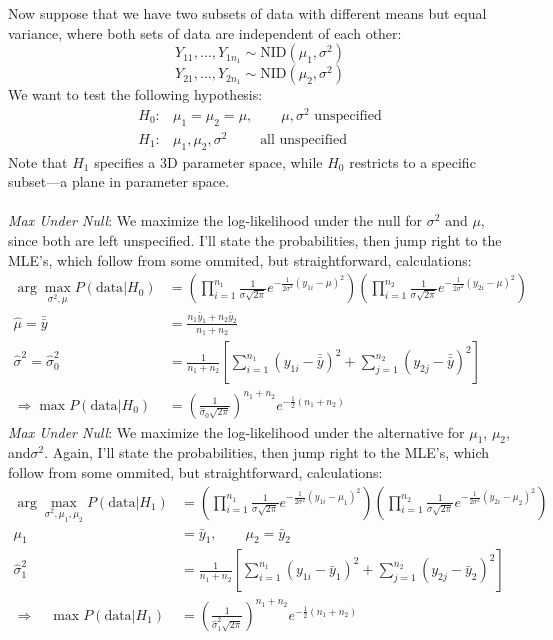 \documentclass[a4paper,12pt]{scrartcl}
\begin{document}
Now suppose that we have two subsets of data with different means
but equal variance, where both sets of data are independent of each
other:
   \[ Y_{11}, \ldots, Y_{1n_1} \sim \text{NID}(\mu_1, \sigma^2) \]
   \[ Y_{21}, \ldots, Y_{2n_1} \sim \text{NID}(\mu_2, \sigma^2) \]
We want to test the following hypothesis:
\begin{align*}
   H_0:& \mu_1 = \mu_2 = \mu, \qquad \mu, \sigma^2
      \text{ unspecified} \\
    H_1:& \mu_1, \mu_2, \sigma^2 \qquad \text{ all unspecified}
\end{align*}
Note that $H_1$ specifies a 3D parameter space, while $H_0$ restricts
to a specific subset---a plane in parameter space.
\\
\\
{\sl Max Under Null}: We maximize the log-likelihood under the null
for $\sigma^2$ and $\mu$, since both are left unspecified.
I'll state the probabilities, then jump right to
the MLE's, which follow from some ommited, but straightforward,
calculations:
\begin{align*}
   \arg \max_{\sigma^2, \mu}
   P(\text{data} | H_0) &= \left( \prod^{n_1}_{i=1} \frac{1}{\sigma
      \sqrt{2\pi}} e^{-\frac{1}{2\sigma^2} (y_{1i} - \mu)^2}
      \right) \left( \prod^{n_2}_{i=1} \frac{1}{\sigma
	 \sqrt{2\pi}} e^{-\frac{1}{2\sigma^2} (y_{2i} - \mu)^2}
      \right)\\
   \hat{\mu} = \bar{\bar{y}}&=
      \frac{n_1 \bar{y}_1 + n_2 \bar{y}_2}{n_1 + n_2}\\
   \hat{\sigma}^2 = \hat{\sigma}^2_0 &= \frac{1}{n_1 + n_2}
   \left[ \sum_{i=1}^{n_1} (y_{1i} - \bar{\bar{y}})^2 +
	 \sum_{j=1}^{n_2} (y_{2j} - \bar{\bar{y}})^2 \right]\\
   \Rightarrow \max P(\text{data} | H_0) &=
      \left( \frac{1}{\hat{\sigma}_0 \sqrt{2\pi}}\right)^{n_1+n_2}
      e^{-\frac{1}{2} (n_1+n_2)}
\end{align*}
{\sl Max Under Null}: We maximize the log-likelihood under the
alternative for $\mu_1$, $\mu_2$, and$\sigma^2$. Again, I'll state the
probabilities, then jump right to
the MLE's, which follow from some ommited, but straightforward,
calculations:
\begin{align*}
   \arg \max_{\sigma^2, \mu_1,\mu_2}
   P(\text{data} | H_1) &= \left( \prod^{n_1}_{i=1} \frac{1}{\sigma
      \sqrt{2\pi}} e^{-\frac{1}{2\sigma^2} (y_{1i} - \mu_1)^2}
      \right) \left( \prod^{n_2}_{i=1} \frac{1}{\sigma
	 \sqrt{2\pi}} e^{-\frac{1}{2\sigma^2} (y_{2i} - \mu_2)^2}
      \right)\\
   \mu_1 &= \bar{y}_1, \qquad \mu_2 = \bar{y}_2\\
      \hat{\sigma}^2_1 &= \frac{1}{n_1+n_2} \left[
      \sum^{n_1}_{i=1} (y_{1i} - \bar{y}_1)^2 +
      \sum^{n_2}_{j=1} (y_{2j} - \bar{y}_2)^2\right]\\
   \Rightarrow \quad \max P(\text{data} | H_1) &=
      \left( \frac{1}{\hat{\sigma}^2_1\sqrt{2\pi}} \right)^{n_1+n_2}
      e^{-\frac{1}{2}(n_1+n_2)}
\end{align*}
\end{document}
